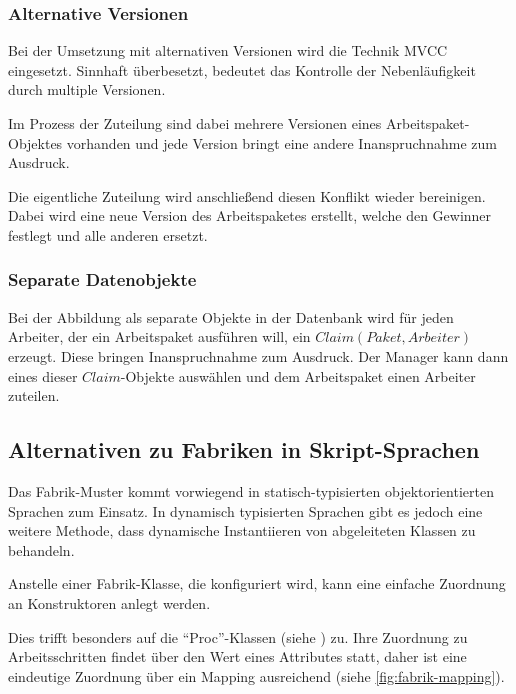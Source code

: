 \subsubsection{Alternative Versionen}

Bei der Umsetzung mit alternativen Versionen wird die Technik \ac{MVCC} eingesetzt.
Sinnhaft überbesetzt, bedeutet das Kontrolle der Nebenläufigkeit durch multiple Versionen.

Im Prozess der Zuteilung sind dabei mehrere Versionen eines Arbeitspaket-Objektes vorhanden und jede Version bringt eine andere Inanspruchnahme zum Ausdruck.

Die eigentliche Zuteilung wird anschließend diesen Konflikt wieder bereinigen.
Dabei wird eine neue Version des Arbeitspaketes erstellt, welche den Gewinner festlegt und alle anderen ersetzt.

\subsubsection{Separate Datenobjekte}

Bei der Abbildung als separate Objekte in der Datenbank
wird für jeden Arbeiter, der ein Arbeitspaket ausführen will, ein $Claim (Paket, Arbeiter)$ erzeugt. Diese bringen Inanspruchnahme zum Ausdruck.
Der Manager kann dann eines dieser $Claim$-Objekte auswählen und dem Arbeitspaket einen Arbeiter zuteilen.

\subsection{Alternativen zu Fabriken in Skript-Sprachen}

Das Fabrik-Muster kommt vorwiegend in statisch-typisierten objektorientierten Sprachen zum Einsatz. In dynamisch typisierten Sprachen gibt es jedoch eine weitere Methode, dass dynamische Instantiieren von abgeleiteten Klassen zu behandeln.

Anstelle einer Fabrik-Klasse, die konfiguriert wird,
kann eine einfache Zuordnung an Konstruktoren anlegt werden.

Dies trifft besonders auf die ``Proc''-Klassen (siehe ) zu.
Ihre Zuordnung zu Arbeitsschritten findet über den Wert eines Attributes statt,
daher ist eine eindeutige Zuordnung über ein Mapping ausreichend (siehe \cref{fig:fabrik-mapping}).

